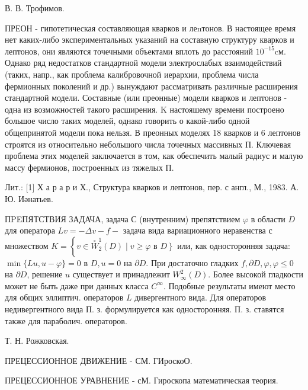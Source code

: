 \documentclass[10pt]{article}
\begin{document}
В. В. Трофимов.



ПРЕОН - гипотетическая составляющая кварков и леnтонов. В настоящее время нет каких-либо экспериментальных указаний на составную структуру кварков и лептонов, они являются точечными объектами вплоть до расстояний $10^{-15} \mathrm{cм}$. Однако ряд недостатков стандартной модели электрослабых взаимодействий (таких, напр., как проблема калибровочной иерархии, проблема числа фермионных поколений и др.) вынуждают рассматривать различные расширения стандартной модели. Составные (или преонные) модели кварков и лептонов - одна из возможностей такого расширения. K настояшему времени построено большое число таких моделей, однако говорить о какой-либо одной общепринятой модели пока нельзя. В преонных моделях 18 кварков и 6 лептонов строятся из относительно небольшого числа точечных массивных П. Ключевая проблема этих моделей заключается в том, как обеспечить малый радиус и малую массу фермионов, построенных из тяжелых П.



Лит.: [1] Х а р а р и Х., Структура кварков и лептонов, пер. с англ., М., 1983. А. Ю. Иәнатьев.



ПPEПЯТСТВИЯ ЗАДАЧА, задача С (внутренним) препятствием $\varphi$ в области $D$ для оператора $L v=-\Delta v-f-$ задача вида вариационного неравенства с множеством $K=\left\{v \in \stackrel{\circ}{W}_{2}^{1}(D) \mid v \geqslant \varphi\right.$ в $\left.D\right\}$ или, как односторонняя задача: $\min \{L u, u-\varphi\}=0$ в $D, u=0$ на $\partial D$. При достаточно гладких $f, \partial D, \varphi, \varphi \leqslant 0$ на $\partial D$, решение $u$ существует и принадлежит $W_{\infty}^{2}(D)$. Более высокой гладкости может не быть даже при данных класса $C^{\infty}$. Подобные результаты имеют место для общих эллиптич. операторов $L$ дивергентного вида. Для операторов недивергентного вида П. з. формулируется как односторонняя. П. з. ставятся также для параболич. операторов.



Т. Н. Рожковская.



ПРЕЦЕССИОННОЕ ДВИЖЕНИЕ - СМ. ГИроскоО.



ПРЕЦЕССИОННОЕ УРАВНЕНИЕ - сМ. Гироскопа математическая теория.
\end{document}
